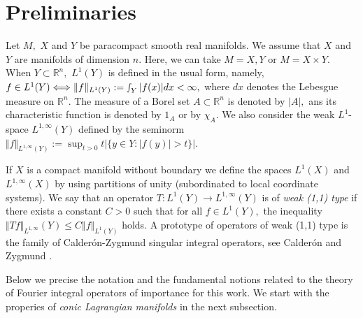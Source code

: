 \documentclass[12pt, reqno]{amsart}
\theoremstyle{definition}
\theoremstyle{remark}
\numberwithin{equation}{section}
\begin{document}
\section{Preliminaries}\label{Section:pre}
Let $M,$ $X$ and $Y$ be paracompact smooth real manifolds. We assume that $X$ and $Y$  are manifolds of dimension $n.$  Here, we can take $M=X,Y$ or $M=X\times Y.$ When $Y\subset \mathbb{R}^n,$  $L^{1}(Y)$ is defined in the usual form, namely,  
 $ 
    f\in L^{1}(Y) \Longleftrightarrow  \Vert f\Vert_{L^1(Y)}:=\smallint_{Y}|f(x)|dx<\infty,
$ where $dx$ denotes the Lebesgue measure on $\mathbb{R}^n.$ The measure of a Borel set $A\subset \mathbb{R}^n$ is denoted by $|A|,$ ans its characteristic function is denoted by $1_A$ or by $\chi_A.$  We also consider the weak $L^1$-space $L^{1,\infty}(Y)$ defined by the seminorm
$  \Vert f\Vert_{L^{1,\infty}(Y) }:=\sup_{t>0}t|\{y\in Y:|f(y)|>t\}|. $ 

If $X$ is a compact manifold without boundary we define the spaces $L^{1}(X)$ and $L^{1,\infty}(X)$ by using partitions of unity (subordinated to local coordinate systems). We say that an operator $T:L^{1}(Y)\rightarrow L^{1,\infty}(Y)$ is of {\it weak (1,1) type} if there exists a constant $C>0$ such that for all $f\in L^{1}(Y),$ the inequality $\Vert Tf\Vert_{L^{1,\infty}}(Y)\leq C\Vert f\Vert_{L^{1}(Y)}$ holds. A prototype of operators of weak (1,1) type is the family of Calder\'on-Zygmund singular integral operators, see Calder\'on and Zygmund \cite{CalderonZygmund1952}.

Below we precise the notation and the fundamental notions related to the theory of Fourier integral operators of importance for this work. We start with the properies of {\it conic Lagrangian manifolds} in the next subsection.
\end{document}
